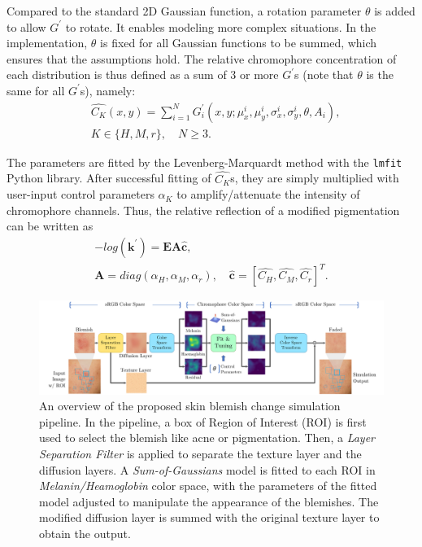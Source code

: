 \begin{spacing}{1.5}
Compared to the standard 2D Gaussian function, a rotation parameter $\theta$ is added to allow $G^\prime$ to rotate. It enables modeling more complex situations. In the implementation, $\theta$ is fixed for all Gaussian functions to be summed, which ensures that the assumptions hold. The relative chromophore concentration of each distribution is thus defined as a sum of 3 or more $G^\prime$s (note that $\theta$ is the same for all $G^\prime$s), namely:
\begin{equation}
    \begin{aligned}
         & \hat{C_K}(x,y) = \sum_{i=1}^{N}G_i^\prime(x, y; \mu_x^i, \mu_y^i, \sigma_x^i, \sigma_y^i, \theta, A_i), \\
         & K\in\{H,M,r\},\quad N\ge3.
    \end{aligned}
\end{equation}

The parameters are fitted by the Levenberg-Marquardt method\cite{10.1007/BFb0067700} with the \texttt{lmfit} Python library\cite{newville_matthew_2014_11813}. After successful fitting of $\hat{C_K}$s, they are simply multiplied with user-input control parameters $\alpha_K$ to amplify/attenuate the intensity of chromophore channels. Thus, the relative reflection of a modified pigmentation can be written as
\begin{gather*}
    -log(\mathbf{k}^\prime) = \mathbf{E}\mathbf{A}\hat{\mathbf{c}},\\
    \mathbf{A}=diag(\alpha_H, \alpha_M, \alpha_r),\quad
    \hat{\mathbf{c}} = [\hat{C_H}, \hat{C_M}, \hat{C_r}]^T.
\end{gather*}


\begin{figure}[t]
    \centering
    \includegraphics[width=0.94\columnwidth]{Chapter3/system.pdf}
    \caption{An overview of the proposed skin blemish change simulation pipeline. In the pipeline, a box of Region of Interest (ROI) is first used to select the blemish like acne or pigmentation. Then, a \textit{Layer Separation Filter} is applied to separate the texture layer and the diffusion layers. A \textit{Sum-of-Gaussians} model is fitted to each ROI in \textit{Melanin/Heamoglobin} color space, with the parameters of the fitted model adjusted to manipulate the appearance of the blemishes. The modified diffusion layer is summed with the original texture layer to obtain the output.}
    \label{fig:system}
\end{figure}

\end{spacing}
